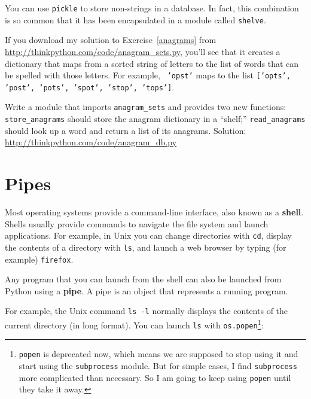 \documentclass[10pt]{book}
\begin{document}
You can use {\tt pickle} to store non-strings in a database.
In fact, this combination is so common that it has been
encapsulated in a module called {\tt shelve}.


\begin{exercise}

If you download my solution to Exercise~\ref{anagrams} from
\url{http://thinkpython.com/code/anagram_sets.py}, you'll see that it creates
a dictionary that maps from a sorted string of letters to the list of
words that can be spelled with those letters.  For example, {\tt
  'opst'} maps to the list {\tt ['opts', 'post', 'pots', 'spot',
    'stop', 'tops']}.

Write a module that imports \verb"anagram_sets" and provides
two new functions: \verb"store_anagrams" should store the
anagram dictionary in a ``shelf;'' \verb"read_anagrams" should
look up a word and return a list of its anagrams.
Solution: \url{http://thinkpython.com/code/anagram_db.py}

\end{exercise}


\section{Pipes}

Most operating systems provide a command-line interface,
also known as a {\bf shell}.  Shells usually provide commands
to navigate the file system and launch applications.  For
example, in Unix you can change directories with {\tt cd},
display the contents of a directory with {\tt ls}, and launch
a web browser by typing (for example) {\tt firefox}.

Any program that you can launch from the shell can also be
launched from Python using a {\bf pipe}.  A pipe is an object
that represents a running program.

For example, the Unix command {\tt ls -l} normally displays the
contents of the current directory (in long format).  You can
launch {\tt ls} with {\tt os.popen}\footnote{{\tt popen} is deprecated
now, which means we are supposed to stop using it and start using
the {\tt subprocess} module.  But for simple cases, I find
{\tt subprocess} more complicated than necessary.  So I am going
to keep using {\tt popen} until they take it away.}:
\end{document}
